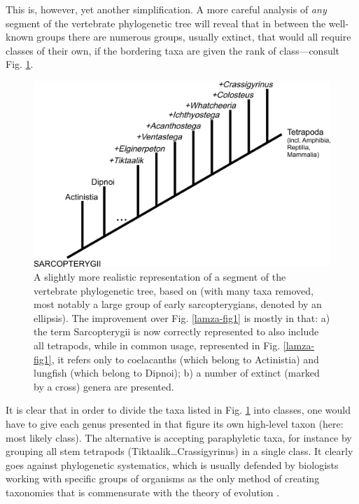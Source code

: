 \begin{artengenv}
This is, however, yet another simplification. A more careful analysis of \textit{any }segment of the vertebrate
phylogenetic tree will reveal that in between the well-known groups there are numerous groups, usually extinct, that
would all require classes of their own, if the bordering taxa are given the rank of class---consult Fig. \ref{lamza-fig2}.

\begin{figure}[h]
	\centering
	\includegraphics[width=1\textwidth]{PAU_Lamza/Lamzaorg-img002.jpg}
	\caption{A slightly more realistic representation of a segment of the vertebrate phylogenetic tree, based on
		\parencite{swartz_marine_2012}
		(with many taxa removed, most notably a large group of early sarcopterygians,
		denoted by an ellipsis). The improvement over Fig. \ref{lamza-fig1} is mostly in that: a) the term Sarcopterygii is now correctly
		represented to also include all tetrapods, while in common usage, represented in Fig. \ref{lamza-fig1}, it refers only to coelacanths
		(which belong to Actinistia) and lungfish (which belong to Dipnoi); b) a number of extinct (marked by a cross) genera
		are presented.}
	\label{lamza-fig2}
\end{figure}

It is clear that in order to divide the taxa listed in Fig. \ref{lamza-fig2} into classes, one would have to give each genus presented
in that figure its own high-level taxon (here: most likely class). The alternative is accepting paraphyletic taxa, for
instance by grouping all stem tetrapods (Tiktaalik\ldots Crassigyrinus) in a single class. It clearly goes against
phylogenetic systematics, which is usually defended by biologists working with specific groups of organisms as the only
method of creating taxonomies that is commensurate with the theory of evolution
\parencite[see e.g.][]{williams_pursuit_2007}.


\end{artengenv}
